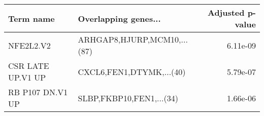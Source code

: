 \begin{tabular}{llr}
\toprule
        Term name &        Overlapping genes... &  Adjusted p-value \\
\midrule
        NFE2L2.V2 & ARHGAP8,HJURP,MCM10,...(87) &          6.11e-09 \\
CSR LATE UP.V1 UP &    CXCL6,FEN1,DTYMK,...(40) &          5.79e-07 \\
 RB P107 DN.V1 UP &    SLBP,FKBP10,FEN1,...(34) &          1.66e-06 \\
\bottomrule
\end{tabular}
